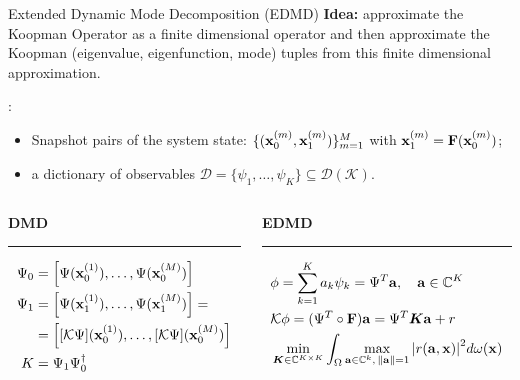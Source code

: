\documentclass{beamer}
\begin{document}
\begin{frame}{Extended Dynamic Mode Decomposition (EDMD)}
\alert{\textbf{Idea:}} approximate the Koopman Operator as a finite dimensional operator and then approximate the Koopman (eigenvalue, eigenfunction, mode) tuples from this finite dimensional approximation. 

\medskip
{}:
\begin{itemize}
    \item Snapshot pairs of the system state: $\{(\vb{x}_0^{(m)}, \vb{x}_1^{(m)})\}_{m = 1}^M$ with $\vb{x}_1^{(m)} = \vb{F}(\vb{x}_0^{(m)})$;
    \item a dictionary of observables $\mathcal{D} = \{\psi_1, \dots, \psi_K\} \subseteq \mathcal{D}(\mathcal{K})$.
\end{itemize}
\begin{columns}[T] %
\begin{column}{.48\textwidth}
{\textbf{DMD}\\\vspace{-6pt}\rule{\linewidth}{3pt}}
{\footnotesize
\begin{equation*}
    \begin{split}
        \Psi_0 &= \left[\Psi(\vb{x}_0^{(1)}), \dots, \Psi(\vb{x}_0^{(M)})\right]\\
        \Psi_1 &= \left[\Psi(\vb{x}_1^{(1)}), \dots, \Psi(\vb{x}_1^{(M)})\right] = \\
        & = \left[[\mathcal{K}\Psi](\vb{x}_0^{(1)}), \dots, [\mathcal{K}\Psi](\vb{x}_0^{(M)})\right] \\
        K &= \Psi_1\Psi_0^{\dagger}
    \end{split}
\end{equation*}}
\end{column}%
\hfill%
\begin{column}{.48\textwidth}
{\textbf{EDMD}\\\vspace{-6pt}\rule{\linewidth}{3pt}}
{\footnotesize
\begin{equation*}
    \begin{split}
        &\phi = \sum_{k=1}^K a_k\psi_k = \Psi^T\vb{a}, \quad \vb{a}\in\mathbb{C}^K \\
        &\mathcal{K}\vb{\phi} = (\Psi^T \circ \vb{F})\vb{a} = \Psi^T\vb*K\vb{a} + r\\
        &\min_{\vb*{K}\in\mathbb{C}^{K\times K}}\int_{\Omega} \max_{\vb{a}\in\mathbb{C}^k,\,\norm{\vb{a}} = 1}\abs{r(\vb{a}, \vb{x})}^2 d\omega(\vb{x})
    \end{split}
\end{equation*}}
\end{column}%
\end{columns}
\end{frame}
\end{document}
